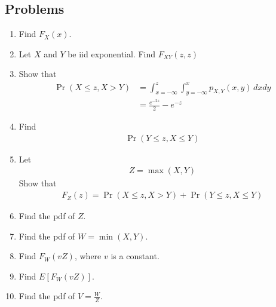 \documentclass[journal,12pt,onecolumn]{IEEEtran}
\renewcommand\thesection{\arabic{section}}
\renewcommand\thesubsection{\thesection.\arabic{subsection}}
\providecommand{\pr}[1]{\ensuremath{\Pr\left(#1\right)}}
\providecommand{\sbrak}[1]{\ensuremath{{}\left[#1\right]}}
\providecommand{\brak}[1]{\ensuremath{\left(#1\right)}}
\theoremstyle{remark}
\numberwithin{equation}{section}
\begin{document}
\subsection{Problems}
\begin{enumerate}[label=\arabic*.,ref=\thesubsection.\theenumi]
\item Find $F_X(x)$.
\item  Let $X$ and $Y$ be iid exponential.   Find
	$F_{XY}\brak{z,z}$
\item  Show that
\begin{align}
	\pr{X\leq z,X>Y} &= \int _{x = -\infty}^{z}\int _{y=-\infty}^{x} p_{X,Y}(x,y) \,dxdy 
	\\
	&= \frac{e^{-2z}}{2} - e^{-z}
\end{align}
\item Find 
\begin{align}
	\pr{Y\leq z,X\leq Y} 
\end{align}
\item Let 
\begin{align}
Z = \max(X,Y)
\end{align}
Show that
\begin{align}
	F_Z(z) =\pr{X\leq z,X>Y}+ \pr{Y\leq z,X\leq Y}
\end{align}
\item Find the pdf of $Z$.
\item Find the pdf of $W=\min(X,Y)$.
\item Find $F_{W}(vZ)$, where $v$ is a constant.
\item Find $E\sbrak{F_{W}(vZ)}$.
\item Find the pdf of $V = \frac{W}{Z}$.
\end{enumerate}
\end{document}
